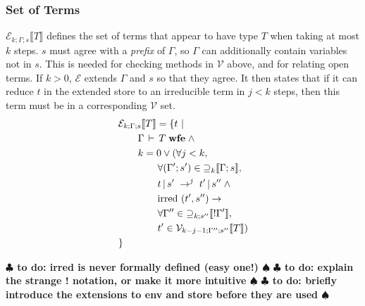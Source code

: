 \documentclass[9pt]{sigplanconf}
\newcommand{\gap}{\quad\quad}
\newcommand{\ts}{\,\vdash\,}
\newcommand{\remark}[1]{{\bf $\clubsuit$ #1 $\spadesuit$}}
\newcommand{\todo}[1]{\remark{to do: #1}}
\newcommand{\wfe}{\;\mbox{\textbf{wfe}}}
\newcommand{\relv}[4]{\mathcal{V}_{#1;#2;#3}\llbracket#4\rrbracket}
\newcommand{\rele}[4]{\mathcal{E}_{#1;#2;#3}\llbracket#4\rrbracket}
\newcommand{\rels}[3]{\mathcal{\supseteq}_{#1}\llbracket#2;#3\rrbracket}
\newcommand{\relg}[3]{\mathcal{\supseteq}_{#1;#2}\llbracket!#3\rrbracket}
\newcommand{\irred}[2]{\text{irred }(#1,#2)}
\newcommand{\andl}{\;\wedge\;}
\newcommand{\orl}{\vee}
\newcommand{\impliesl}{\rightarrow}
\newcommand{\reductionl}[5]{#1 \operatorname{|} #2 \;\rightarrow^{#5}\; #3 \operatorname{|} #4}
\begin{document}
\subsubsection{Set of Terms}
$\rele k \Gamma s T$ defines the set of terms that appear to have type
$T$ when taking at most $k$ steps. $s$ must agree with a {\it prefix}
of $\Gamma$, so $\Gamma$ can additionally contain variables not in
$s$. This is needed for checking methods in $\mathcal{V}$ above, and
for relating open terms. If $k > 0$, $\mathcal{E}$ extends $\Gamma$
and $s$ so that they agree. It then states that if it can reduce $t$
in the extended store to an irreducible term in $j < k$ steps, then
this term must be in a corresponding $\mathcal{V}$ set.
\begin{align*}
&\rele k \Gamma s T = \{ t \ |\\
&\gap \Gamma \ts T \wfe \andl\\
&\gap k = 0 \orl (\forall j < k,\\
&\gap\gap \forall (\Gamma'; s') \in \rels k \Gamma s ,\\
&\gap\gap \reductionl t {s'} {t'} {s''} j \andl\\
&\gap\gap \irred {t'} {s''} \impliesl\\
&\gap\gap \forall \Gamma'' \in \relg k {s''} {\Gamma'} ,\\
&\gap\gap {t'} \in \relv {k-j-1} {\Gamma''} {s''} T)\\
&\}
\end{align*}

\todo{irred is never formally defined (easy one!)}
\todo{explain the strange ! notation, or make it more intuitive}
\todo{briefly introduce the extensions to env and store before they are used}
\end{document}
